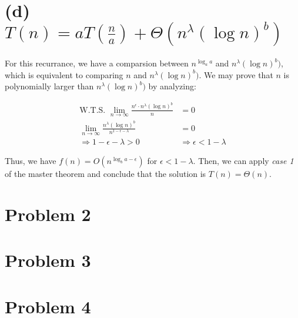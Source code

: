 \documentclass[11pt]{article}
\begin{document}
\section{(d) $T(n) = aT(\frac{n}{a}) + \Theta(n^{\lambda}(\log n)^b)$}
For this recurrance, we have a comparsion between $n^{\log_a a}$ and $n^{\lambda}(\log n)^b)$, which is equivalent to comparing $n$ and $n^{\lambda}(\log n)^b)$. We may prove that $n$ is polynomially larger than $n^{\lambda}(\log n)^b)$ by analyzing:

\begin{align}
    \text{W.T.S. \ }\lim_{n \to \infty} \frac{n^\epsilon \cdot n^\lambda (\log n)^b}{n} &= 0\\
    \lim_{n \to \infty} \frac{n^\lambda (\log n)^b}{n^{1-\epsilon - \lambda}} &= 0 \nonumber\\
    \Longrightarrow 1-\epsilon - \lambda > 0 &\Rightarrow \epsilon < 1 - \lambda
\end{align}

Thus, we have $f(n) = O(n^{\log_b a - \epsilon})$ for $\epsilon < 1 - \lambda$. Then, we can apply \textit{case 1} of the master theorem and conclude that the solution is $T(n) = \Theta(n)$.




\section{Problem 2}


\section{Problem 3}


\section{Problem 4}
\end{document}
